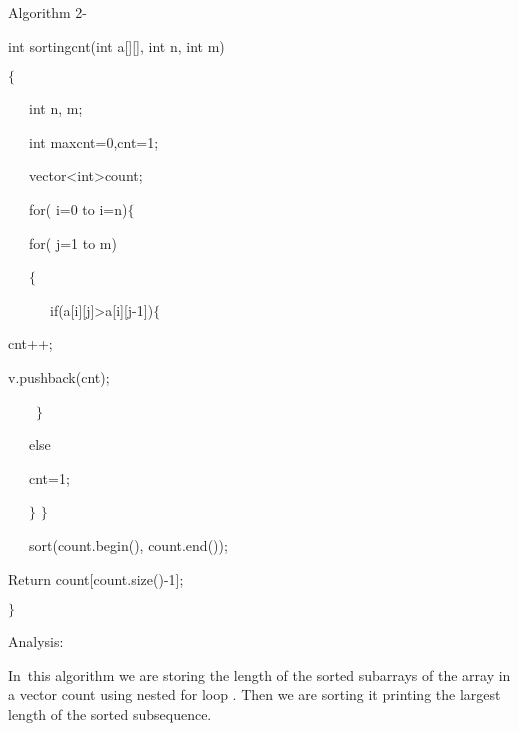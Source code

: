 \documentclass[12pt]{report}
\renewcommand{\_}{\kern-1.5pt\textunderscore\kern-1.5pt}
\begin{document}
\begin{multicols}{2}
\begin{enumerate}
\vspace{\baselineskip}
Algorithm 2-\par

int sorting\_cnt(int a[][], int n, int m)\par

$ \{ $ \par

\ \ \  int n, m;\par

\ \ \  int max\_cnt=0,cnt=1;\par

\ \ \  vector<int>count;\par

\ \ \  for( i=0 to i=n)$ \{ $ \par

\ \ \  for( j=1 to m)\par

\ \ \  $ \{ $ \par

\ \ \ \ \ \  if(a[i][j]>a[i][j-1])$ \{ $ \par

\tab cnt++;\tab \par

\tab v.push\_back(cnt);\par

\ \ \ \  $ \} $ \par

\ \ \  else\par

\ \ \  \tab cnt=1;\par

\ \ \  $ \} $ $ \} $ \par

\ \ \  sort(count.begin(), count.end());\par

\tab Return count[count.size()-1];\par

$ \} $ \par

Analysis:\par

In\ this algorithm we are storing the  length of the sorted subarrays of the array in a vector count using nested for loop . Then we are sorting it printing the largest length of the sorted subsequence. \par


\vspace{\baselineskip}


\end{enumerate}
\end{multicols}
\end{document}
